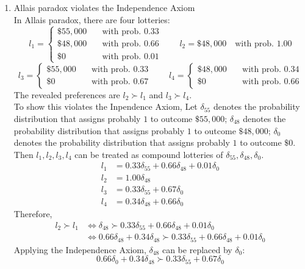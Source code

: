 \documentclass{article}
\begin{document}
\begin{enumerate}
\item Allais paradox violates the Independence Axiom \\

In Allais paradox, there are four lotteries:
\[
l_1 = 
\begin{cases}
    \$55,000\quad & \textrm{with prob. } 0.33 \\
    \$48,000\quad & \textrm{with prob. } 0.66 \\
    \$0\quad & \textrm{with prob. } 0.01
\end{cases} 
\qquad
l_2 = \$48,000 \quad \textrm{with prob. 1.00}
\]
\[
l_3 = 
\begin{cases}
    \$55,000\quad & \textrm{with prob. } 0.33 \\
    \$0 \quad & \textrm{with prob. } 0.67
\end{cases} 
\qquad
l_4 = 
\begin{cases}
    \$48,000 \quad & \textrm{with prob. } 0.34 \\
    \$0 \quad & \textrm{with prob. } 0.66
\end{cases}
\]
The revealed preferences are $l_2 \succ l_1$ and $l_3 \succ l_4$.\\

To show this violates the Inpendence Axiom,
Let $\delta_{55}$ denotes the probability distribution that assigns probably $1$ to outcome $\$55,000$;
$\delta_{48}$ denotes the probability distribution that assigns probably $1$ to outcome $\$48,000$;
$\delta_{0}$ denotes the probability distribution that assigns probably $1$ to outcome $\$0$.
Then $l_1, l_2, l_3, l_4$ can be treated as compound lotteries of $\delta_{55}, \delta_{48}, \delta_0$.
\begin{align*}
    l_1 &= 0.33 \delta_{55} + 0.66 \delta_{48} + 0.01 \delta_{0} \\
    l_2 &= 1.00 \delta_{48} \\
    l_3 &= 0.33 \delta_{55} + 0.67 \delta_{0} \\
    l_4 &= 0.34 \delta_{48} + 0.66 \delta_{0}
\end{align*}
Therefore,
\begin{align*}
    l_2 \succ l_1 &\iff  \delta_{48} \succ 0.33 \delta_{55} + 0.66 \delta_{48} + 0.01 \delta_{0} \\
                  &\iff 0.66\delta_{48} + 0.34\delta_{48} \succ 0.33 \delta_{55} + 0.66 \delta_{48} + 0.01 \delta_{0}
\end{align*}
Applying the Independence Axiom, $\delta_{48}$ can be replaced by $\delta_{0}$:
$$ 0.66\delta_{0} + 0.34\delta_{48} \succ 0.33 \delta_{55} + 0.67 \delta_{0} $$


\end{enumerate}
\end{document}
